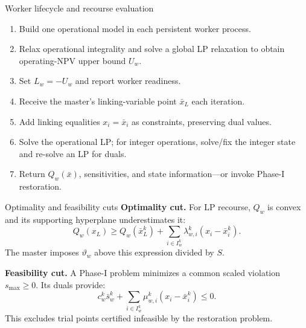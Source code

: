 \documentclass[aspectratio=169,10pt]{beamer}
\begin{document}
\begin{frame}{Worker lifecycle and recourse evaluation}
\begin{enumerate}
\item Build one operational model in each persistent worker process.
\item Relax operational integrality and solve a global LP relaxation to obtain operating-NPV upper bound $U_w$.
\item Set $L_w=-U_w$ and report worker readiness.
\item Receive the master's linking-variable point $\bar{x}_L$ each iteration.
\item Add linking equalities $x_i=\bar{x}_i$ as constraints, preserving dual values.
\item Solve the operational LP; for integer operations, solve/fix the integer state and re-solve an LP for duals.
\item Return $Q_w(\bar{x})$, sensitivities, and state information—or invoke Phase-I restoration.
\end{enumerate}
\end{frame}

\begin{frame}{Optimality and feasibility cuts}
\small
\textbf{Optimality cut.} For LP recourse, $Q_w$ is convex and its supporting hyperplane underestimates it:
\[
Q_w(x_L)\geq Q_w(\bar{x}_L^k)+
\sum_{i\in I_w^k}\lambda_{w,i}^k(x_i-\bar{x}_i^k).
\]
The master imposes $\vartheta_w$ above this expression divided by $S$.

\vspace{2mm}
\textbf{Feasibility cut.} A Phase-I problem minimizes a common scaled violation $s_{\max}\geq0$. Its duals provide:
\[
c_w^k\bar{s}_w^k+
\sum_{i\in I_w^k}\mu_{w,i}^k(x_i-\bar{x}_i^k)\leq0.
\]
This excludes trial points certified infeasible by the restoration problem.
\end{frame}
\end{document}
